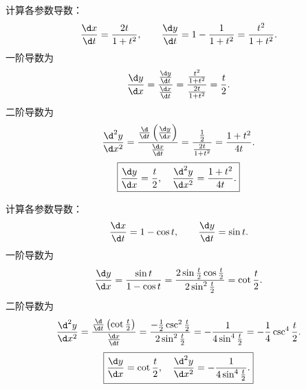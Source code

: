 \begin{solution}

    计算各参数导数：
    \begin{equation}
        \frac{\d x}{\d t} = \frac{2t}{1+t^2}, \qquad \frac{\d y}{\d t} = 1 - \frac{1}{1+t^2} = \frac{t^2}{1+t^2}.
    \end{equation}
    一阶导数为
    \begin{equation}
        \frac{\d y}{\d x} = \frac{\frac{\d y}{\d t}}{\frac{\d x}{\d t}} = \frac{\frac{t^2}{1+t^2}}{\frac{2t}{1+t^2}} = \frac{t}{2}.
    \end{equation}
    二阶导数为
    \begin{equation}
        \frac{\d^2 y}{\d x^2} = \frac{\frac{\d}{\d t}\left( \frac{\d y}{\d x} \right)}{\frac{\d x}{\d t}} = \frac{\frac{1}{2}}{\frac{2t}{1+t^2}} = \frac{1+t^2}{4t}.
    \end{equation}
    \begin{equation}
        \boxed{\frac{\d y}{\d x} = \frac{t}{2}, \quad \frac{\d^2 y}{\d x^2} = \frac{1+t^2}{4t}.}
    \end{equation}


    计算各参数导数：
    \begin{equation}
        \frac{\d x}{\d t} = 1 - \cos t, \qquad \frac{\d y}{\d t} = \sin t.
    \end{equation}
    一阶导数为
    \begin{equation}
        \frac{\d y}{\d x} = \frac{\sin t}{1 - \cos t} = \frac{2\sin\frac{t}{2}\cos\frac{t}{2}}{2\sin^2\frac{t}{2}} = \cot \frac{t}{2}.
    \end{equation}
    二阶导数为
    \begin{equation}
        \frac{\d^2 y}{\d x^2} = \frac{\frac{\d}{\d t}\left(\cot \frac{t}{2}\right)}{\frac{\d x}{\d t}} = \frac{-\frac{1}{2}\csc^2\frac{t}{2}}{2\sin^2\frac{t}{2}} = -\frac{1}{4\sin^4\frac{t}{2}} = -\frac{1}{4}\csc^4\frac{t}{2}.
    \end{equation}
    \begin{equation}
        \boxed{\frac{\d y}{\d x} = \cot \frac{t}{2}, \quad \frac{\d^2 y}{\d x^2} = -\frac{1}{4\sin^4\frac{t}{2}}.}
    \end{equation}



\end{solution}
